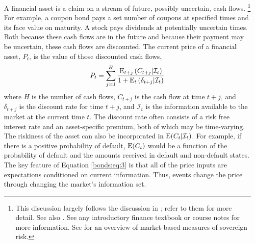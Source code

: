 A financial asset is a claim on a stream of future, possibly uncertain, cash flows.%
\footnote{
  This discussion largely follows the discussion in \textcite[673]{GuidolinLaFerrara2010}; refer to them for more detail.
  See also \textcite{HaberMitchenerOosterlinckEtAl2015}.
  See any introductory finance textbook or course notes for more information.
  See \textcite{Chan-Lau2006} for an overview of market-based measures of sovereign risk.
}
For example, a coupon bond pays a set number of coupons at specified times and its face value on maturity.
A stock pays dividends at potentially uncertain times.
Both because these cash flows are in the future and because their payment may be uncertain, these cash flows are discounted.
The current price of a financial asset, $P_{t}$, is the value of those discounted cash flows,
\begin{equation}
  \label{bonds:eq:3}
  P_{t} = \sum_{j = 1}^{H} \frac{\operatorname{E}_{t + j}\left(C_{t + j} | \mathcal{I}_{t}\right)}{1 + \operatorname{E}_{t}\left(\delta_{t+j} | \mathcal{I}_{t}\right)}
\end{equation}
where $H$ is the number of cash flows, $C_{t + j}$ is the cash flow at time $t + j$, and $\delta_{t + j}$ is the discount rate for time $t + j$, and $\mathcal{I}_{t}$ is the information available to the market at the current time $t$.
The discount rate often consists of a risk free interest rate and an asset-specific premium, both of which may be time-varying.
The riskiness of the asset can also be incorporated in $\operatorname{E}(C_{t}| \mathcal{I}_{t})$.
For example, if there is a positive probability of default, $\operatorname{E}(C_{t})$ would be a function of the probability of default and the amounts received in default and non-default states.
The key feature of Equation \eqref{bonds:eq:3} is that all of the price inputs are expectations conditioned on current information.
Thus, events change the price through changing the market's information set. 

